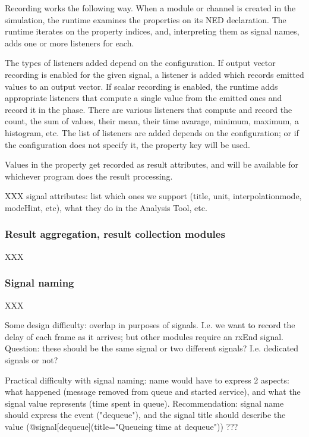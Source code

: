 Recording works the following way. When a module or channel is created in
the simulation, the {\opp} runtime examines the  properties on
its NED declaration. The runtime iterates on the property indices, and,
interpreting them as signal names, adds one or more listeners for each.

The types of listeners added depend on the configuration. If output vector
recording is enabled for the given signal, a listener is added which
records emitted values to an output vector. If scalar recording is enabled,
the runtime adds appropriate listeners that compute a single value from the
emitted ones and record it in the  phase. There are various
listeners that compute and record the count, the sum of values, their mean,
their time avarage, minimum, maximum, a histogram, etc. The list of
listeners are added depends on the configuration; or if the configuration
does not specify it, the  property key will be used.

Values in the property get recorded as result attributes, and will be
available for whichever program does the result processing.

XXX signal attributes: list which ones we support (title, unit, interpolationmode, modeHint, etc), what they do in the Analysis Tool, etc.

\subsubsection{Result aggregation, result collection modules}

XXX

\subsubsection{Signal naming}

XXX

Some design difficulty: overlap in purposes of signals. I.e. we want to record
the delay of each frame as it arrives; but other modules require an rxEnd signal.
Question: these should be the same signal or two different signals? I.e.
dedicated signals or not?

Practical difficulty with signal naming: name would have to express 2 aspects:
what happened (message removed from queue and started service), and what
the signal value represents (time spent in queue). Recommendation:
signal name should express the event ("dequeue"), and the signal title
should describe the value (@signal[dequeue](title="Queueing time at dequeue")) ???



